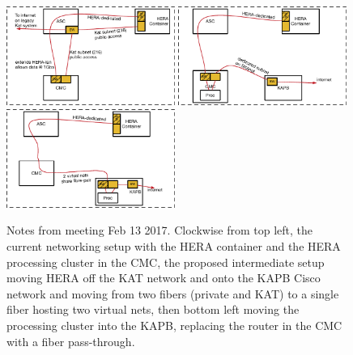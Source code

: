 \documentclass{article}
\begin{document}
\begin{figure}[H]
\includegraphics[width=0.49\textwidth]{initial_lan.pdf}
\includegraphics[width=0.49\textwidth]{intermediate_lan.pdf}
\includegraphics[width=0.49\textwidth]{final_lan.pdf}
\caption{Notes from meeting Feb 13 2017. Clockwise from top left, the current networking setup with the HERA container and the HERA processing cluster in the CMC, the proposed intermediate setup moving HERA off the KAT network and onto the KAPB Cisco network and moving from two fibers (private and KAT) to a single fiber hosting two virtual nets, then bottom left moving the processing cluster into the KAPB, replacing the router in the CMC with a fiber pass-through. \label{fig:network_drawings}}
\end{figure}
\end{document}
